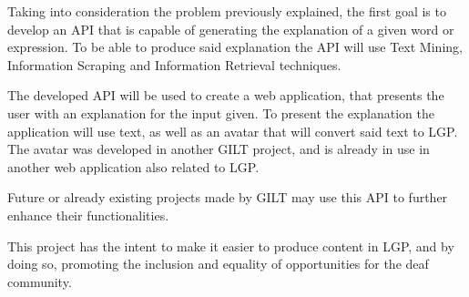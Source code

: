 Taking into consideration the problem previously explained, the first goal is to develop an \gls{API} that is capable of generating the explanation of a given word or expression.
To be able to produce said explanation the \gls{API} will use Text Mining, Information Scraping and Information Retrieval techniques.

The developed \gls{API} will be used to create a web application, that presents the user with an explanation for the input given.
To present the explanation the application will use text, as well as an avatar that will convert said text to \gls{LGP}.
The avatar was developed in another GILT project, and is already in use in another web application also related to \gls{LGP}.

Future or already existing projects made by GILT may use this \gls{API} to further enhance their functionalities.

This project has the intent to make it easier to produce content in \gls{LGP}, and by doing so, promoting the inclusion and equality of opportunities for the deaf community.
